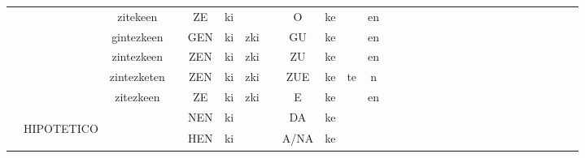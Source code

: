 \documentclass[10pt, a3paper, landscape]{article}
\begin{document}
\begin{table}
\begin{tabular}{|c|c|c|ccccccccc|c|c|cccccccc|ccccccc|}
                              &                                     & zitekeen             &    & ZE  & ki                        &     &    & O    & ke &    & en                   &                      &                      &    &     &    &   &    &     &      &                      &    &     &        &           &    &     &                       \\
                              &                                     & gintezkeen           &    & GEN & ki                        & zki &    & GU   & ke &    & en                   &                      &                      &    &     &    &   &    &     &      &                      &    &     &        &           &    &     &                       \\
                              &                                     & zintezkeen           &    & ZEN & ki                        & zki &    & ZU   & ke &    & en                   &                      &                      &    &     &    &   &    &     &      &                      &    &     &        &           &    &     &                       \\
                              &                                     & zintezketen          &    & ZEN & ki                        & zki &    & ZUE  & ke & te & n                    &                      &                      &    &     &    &   &    &     &      &                      &    &     &        &           &    &     &                       \\
                              &                                     & zitezkeen            &    & ZE  & ki                        & zki &    & E    & ke &    & en                   &                      &                      &    &     &    &   &    &     &      &                      &    &     &        &           &    &     &                       \\ 
\cline{2-29}
                              & \multirow{7}{*}{\begin{sideways}HIPOTETICO\end{sideways}}         &                      &    & NEN & ki                        &     &    & DA   & ke &    &                      &                      &                      &    &     &    &   &    &     &      &                      &    &     &        &           &    &     &                       \\
                              &                                     &                      &    & HEN & ki                        &     &    & A/NA & ke &    &                      &                      &                      &    &     &    &   &    &     &      &                      &    &     &        &           &    &     &                       \\

\end{tabular}
\end{table}
\end{document}
